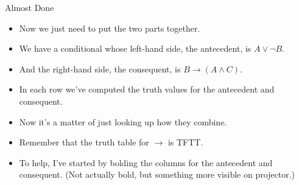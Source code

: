\documentclass[
  ignorenonframetext,
]{beamer}
\providecommand{\tightlist}{%
  \setlength{\itemsep}{0pt}\setlength{\parskip}{0pt}}
\renewcommand{\,}{\text{, }}
\begin{document}
\begin{frame}{Almost Done}
\protect\hypertarget{almost-done}{}

\begin{itemize}
\tightlist
\item
  Now we just need to put the two parts together.
\item
  We have a conditional whose left-hand side, the antecedent, is
  \(A \vee \neg B\).
\item
  And the right-hand side, the consequent, is
  \(B \rightarrow (A \wedge C)\).
\item
  In each row we've computed the truth values for the antecedent and
  consequent.
\item
  Now it's a matter of just looking up how they combine.
\item
  Remember that the truth table for \(\rightarrow\) is TFTT.
\item
  To help, I've started by bolding the columns for the antecedent and
  consequent. (Not actually bold, but something more visible on
  projector.)
\end{itemize}

\end{frame}
\end{document}
